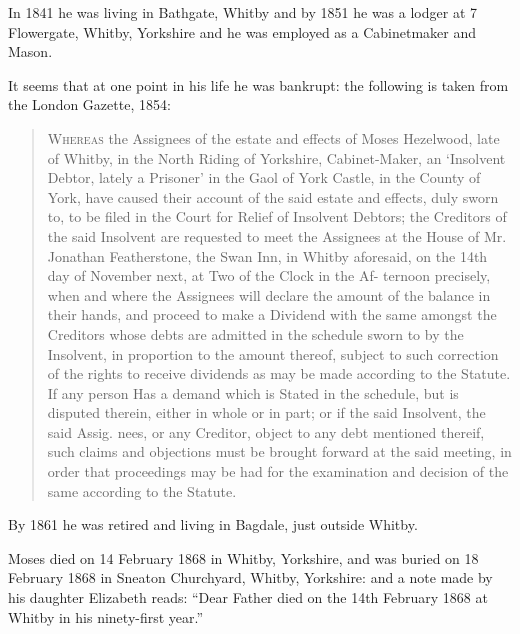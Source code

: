 In 1841 he was living in Bathgate, Whitby \cite{MHezelwood1841} and by 1851 he was a lodger at 7 Flowergate, Whitby, Yorkshire and he was employed as a Cabinetmaker and Mason.\cite{MHezelwood1851}

It seems that at one point in his life he was bankrupt: the following is taken from the London Gazette, 1854:\cite{MHazelwoodBankruptcy}

\begin{quotation}
\textsc{Whereas} the Assignees of the estate and effects of Moses Hezelwood, late of Whitby, in the North Riding of Yorkshire, Cabinet-Maker, an `Insolvent Debtor, lately a Prisoner' in the Gaol of York Castle, in the County of York, have caused their account of the said estate and effects, duly sworn to, to be filed in the Court for Relief of Insolvent Debtors; the Creditors of the said Insolvent are requested to meet the Assignees at the House of Mr. Jonathan Featherstone, the Swan Inn, in Whitby aforesaid, on the 14th day of November next, at Two of the Clock in the Af- ternoon precisely, when and where the Assignees will declare the amount of the balance in their hands, and proceed to make a Dividend with the same amongst the Creditors whose debts are admitted in the schedule sworn to by the Insolvent, in proportion to the amount thereof, subject to such correction of the rights to receive dividends as may be made according to the Statute. If any person Has a demand which is Stated in the schedule, but is disputed therein, either in whole or in part; or if the said Insolvent, the said Assig. nees, or any Creditor, object to any debt mentioned thereif, such claims and objections must be brought forward at the said meeting, in order that proceedings may be had for the examination and decision of the same according to the Statute.
\end{quotation}

By 1861 he was retired and living in Bagdale, just outside Whitby. \cite{MHezelwood1861}

Moses died on 14 February 1868 in Whitby, Yorkshire, and was buried on 18 February 1868 in Sneaton Churchyard,	Whitby, Yorkshire: \cite{MHezelwoodDeath} and a note made by his daughter Elizabeth reads: ``Dear Father died on the 14th February 1868 at Whitby in his ninety-first year.''


